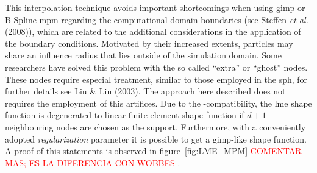 \documentclass[preprint,12pt,a4paper]{elsarticle}
\newcommand{\PNA}[1]{
  \textcolor{red}{{#1}}
}
\begin{document}
This interpolation technique avoids important shortcomings when using
\acrshort{gimp} or B-Spline \acrshort{mpm} regarding the computational domain boundaries
(see Steffen {\it et al.} (2008)\cite{Steffen2008b}), which are related to the
additional considerations in the application of the boundary
conditions. Motivated by their increased extents, particles may share an influence radius that lies outside of the simulation domain. Some researchers have solved this problem with the so called ``extra'' or ``ghost'' nodes. These nodes require especial treatment, similar
to those employed in the \acrfull{sph}, for
further details see Liu \& Liu (2003)\cite{Liu2003}. The approach here
described does not requires the employment of this artifices.
Due to the -compatibility, the \acrshort{lme} shape function is degenerated to
linear finite element shape function if $d+1$ neighbouring nodes are
chosen as the support. Furthermore, with a conveniently adopted
\textit{regularization} parameter it is possible to get a \acrshort{gimp}-like
shape function. A proof of this statements is observed in figure~\ref{fig:LME_MPM}\PNA{COMENTAR MAS; ES LA DIFERENCIA CON WOBBES}. 
\end{document}
